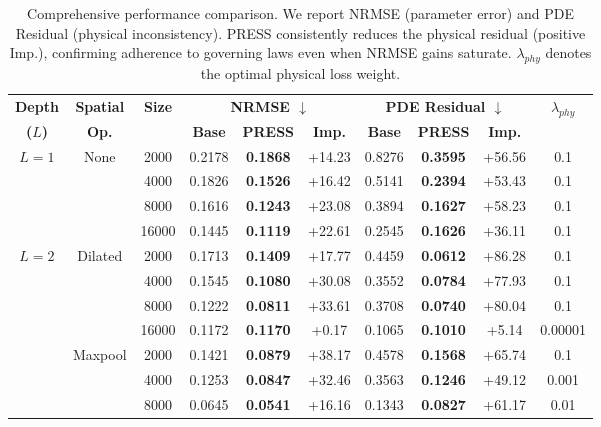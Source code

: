 \documentclass{article} %
\begin{document}
\begin{table}[ht]
\centering
\footnotesize
\caption{Comprehensive performance comparison. We report NRMSE (parameter error) and PDE Residual (physical inconsistency). PRESS consistently reduces the physical residual (positive Imp.), confirming adherence to governing laws even when NRMSE gains saturate. $\lambda_{phy}$ denotes the optimal physical loss weight.}
\label{tab:comprehensive_results}
\vspace{0.3cm}
\begin{tabular}{cccccccccc}
\toprule
\textbf{Depth} & \textbf{Spatial} & \multirow{2}{*}{\textbf{Size}} & \multicolumn{3}{c}{\textbf{NRMSE $\downarrow$}} & \multicolumn{3}{c}{\textbf{PDE Residual $\downarrow$}} & \multirow{2}{*}{\textbf{$\lambda_{phy}$}} \\
\cmidrule(lr){4-6} \cmidrule(lr){7-9}
\textbf{($L$)} & \textbf{Op.} & & \textbf{Base} & \textbf{PRESS} & \textbf{Imp.} & \textbf{Base} & \textbf{PRESS} & \textbf{Imp.} & \\
\midrule
\multirow{4}{*}{$L=1$} & \multirow{4}{*}{None}
  & 2000  & 0.2178 & \textbf{0.1868} & +14.23 & 0.8276 & \textbf{0.3595} & +56.56 & 0.1 \\
& & 4000  & 0.1826 & \textbf{0.1526} & +16.42 & 0.5141 & \textbf{0.2394} & +53.43 & 0.1 \\
& & 8000  & 0.1616 & \textbf{0.1243} & +23.08 & 0.3894 & \textbf{0.1627} & +58.23 & 0.1 \\
& & 16000 & 0.1445 & \textbf{0.1119} & +22.61 & 0.2545 & \textbf{0.1626} & +36.11 & 0.1 \\
\midrule
\multirow{8}{*}{$L=2$} & \multirow{4}{*}{Dilated}
  & 2000  & 0.1713 & \textbf{0.1409} & +17.77 & 0.4459 & \textbf{0.0612} & +86.28 & 0.1 \\
& & 4000  & 0.1545 & \textbf{0.1080} & +30.08 & 0.3552 & \textbf{0.0784} & +77.93 & 0.1 \\
& & 8000  & 0.1222 & \textbf{0.0811} & +33.61 & 0.3708 & \textbf{0.0740} & +80.04 & 0.1 \\
& & 16000 & 0.1172 & \textbf{0.1170} & +0.17  & 0.1065 & \textbf{0.1010} & +5.14  & 0.00001 \\
\cmidrule(lr){2-10}
& \multirow{4}{*}{Maxpool}
  & 2000  & 0.1421 & \textbf{0.0879} & +38.17 & 0.4578 & \textbf{0.1568} & +65.74 & 0.1 \\
& & 4000  & 0.1253 & \textbf{0.0847} & +32.46 & 0.3563 & \textbf{0.1246} & +49.12 & 0.001 \\
& & 8000  & 0.0645 & \textbf{0.0541} & +16.16 & 0.1343 & \textbf{0.0827} & +61.17 & 0.01 \\

\end{tabular}
\end{table}
\end{document}
